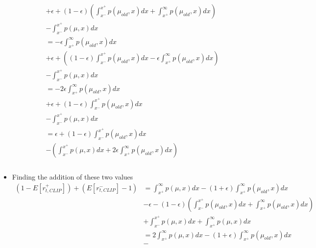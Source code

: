 \documentclass[a4paper]{article}
\begin{document}
\begin{itemize}
\begin{align*}
        &+
        \epsilon
        + 
        (1 - \epsilon)
        \left(
        \int_{x^{-}}^{x^{+}}p(\mu_{old}, x)dx
        +
        \int_{x^{+}}^{\infty}p(\mu_{old}, x)dx
        \right)\\
        &- 
        \int_{x^{-}}^{x^{+}}p(\mu, x)dx 
        \\
        &=
        -\epsilon
        \int_{x^{+}}^{\infty}p(\mu_{old}, x)dx\\
        &+
        \epsilon
        + 
        \left(
        (1 - \epsilon)
        \int_{x^{-}}^{x^{+}}p(\mu_{old}, x)dx
        - \epsilon
        \int_{x^{+}}^{\infty}p(\mu_{old}, x)dx
        \right)\\
        &- 
        \int_{x^{-}}^{x^{+}}p(\mu, x)dx 
        \\
        &=
        -2\epsilon
        \int_{x^{+}}^{\infty}p(\mu_{old}, x)dx\\
        &+
        \epsilon
        + 
        (1 - \epsilon)
        \int_{x^{-}}^{x^{+}}p(\mu_{old}, x)dx
        \\
        &- 
        \int_{x^{-}}^{x^{+}}p(\mu, x)dx 
        \\
        &=
        \epsilon
        + 
        (1 - \epsilon)
        \int_{x^{-}}^{x^{+}}p(\mu_{old}, x)dx
        \\
        &-\left(\int_{x^{-}}^{x^{+}}p(\mu, x)dx 
        +2\epsilon
        \int_{x^{+}}^{\infty}p(\mu_{old}, x)dx\right)\\
        \\
    \end{align*}
    \item Finding the addition of these two values
    \begin{align*}
        (1 - E[r_{t, CLIP}^{+}]) + (E[r_{t, CLIP}^{-}] - 1)
        &=
        \int_{x^{+}}^{\infty}
        p(\mu, x)
        dx -
        (1 + \epsilon)
        \int_{x^{+}}^{\infty}p(\mu_{old}, x)dx\\
        &-
        \epsilon
        - 
        (1 - \epsilon)
        \left(
        \int_{x^{-}}^{x^{+}}p(\mu_{old}, x)dx
        +
        \int_{x^{+}}^{\infty}p(\mu_{old}, x)dx
        \right)\\
        &+ 
        \int_{x^{-}}^{x^{+}}p(\mu, x)dx 
        + 
        \int_{x^{+}}^{\infty}p(\mu, x)dx 
        \\
        &=
        2\int_{x^{+}}^{\infty}
        p(\mu, x)
        dx -
        (1 + \epsilon)
        \int_{x^{+}}^{\infty}p(\mu_{old}, x)dx\\
        &-

\end{align*}
\end{itemize}
\end{document}
